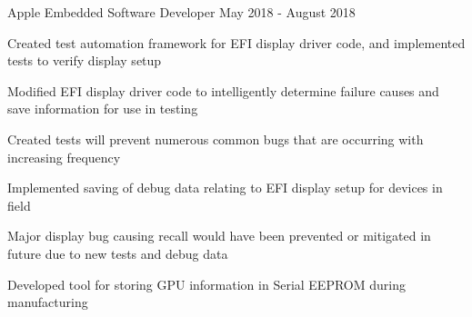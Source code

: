 

\begin{cventries}

  \cventry
    {Apple} %
    {Embedded Software Developer} %
    {May 2018 - August 2018} %
    {}
    {
      \begin{cvitems} %
        \item {Created test automation framework for EFI display driver code, and implemented tests to verify display setup}
        \item {Modified EFI display driver code to intelligently determine failure causes and save information for use in testing}
        \item {Created tests will prevent numerous common bugs that are occurring with increasing frequency}
        \item {Implemented saving of debug data relating to EFI display setup for devices in field}
        \item {Major display bug causing recall would have been prevented or mitigated in future due to new tests and debug data}
        \item {Developed tool for storing GPU information in Serial EEPROM during manufacturing}
      \end{cvitems}
    }


\end{cventries}
